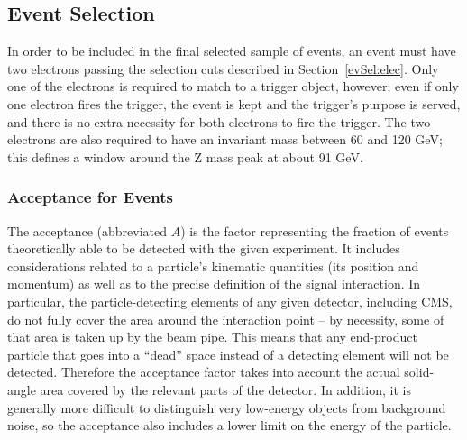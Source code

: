 \subsection{\Zee Event Selection}
\label{evSel:zee}

In order to be included in the final selected sample of \Zee events, 
an event must have two electrons passing the selection cuts 
described in Section~\ref{evSel:elec}.  
Only one of the electrons is required to match to a trigger object, however; 
even if only one electron fires the trigger, 
the event is kept and the trigger's purpose is served, 
and there is no extra necessity for both electrons to fire the trigger.  
The two electrons are also required to have an invariant mass 
between 60 and 120 GeV; 
this defines a window around the Z mass peak at about 91 GeV.  

\subsubsection{Acceptance for \Zee Events}  %
\label{evSel:acc}


The acceptance (abbreviated $A$) 
is the factor representing the fraction of events 
theoretically able to be detected with the given experiment.  
It includes considerations related to a particle's kinematic quantities 
(its position and momentum)
as well as to the precise definition of the signal interaction.  
In particular, the particle-detecting elements of any given 
detector, including CMS, do not fully cover the area around 
the interaction point -- 
by necessity, some of that area is taken up by the beam pipe.  
This means that any end-product particle that goes into a 
``dead'' space instead of a detecting element will not be 
detected.  
Therefore the acceptance factor takes into account the 
actual solid-angle area covered by the relevant parts of the detector.  
In addition, it is generally more difficult to distinguish 
very low-energy objects from background noise, 
so the acceptance also includes a lower limit on the 
energy of the particle.  

